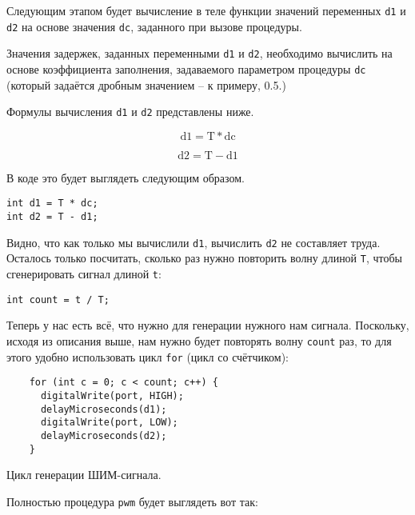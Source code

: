 \documentclass[../sparc.tex]{subfiles}
\begin{document}
Следующим этапом будет вычисление в теле функции значений переменных \texttt{d1}
и \texttt{d2} на основе значения \texttt{dc}, заданного при вызове процедуры.

Значения задержек, заданных переменными \texttt{d1} и \texttt{d2}, необходимо
вычислить на основе коэффициента заполнения, задаваемого параметром процедуры
\texttt{dc} (который задаётся дробным значением -- к примеру, 0.5.)

Формулы вычисления \texttt{d1} и \texttt{d2} представлены ниже.

\begin{equation}
  \mbox{d1} = \mbox{T} * \mbox{dc}
  \label{Формула вычисления времени подачи сигнала ``HIGH''}
\end{equation}

\begin{equation}
  \mbox{d2} = \mbox{T} - \mbox{d1}
  \label{Формула вычисления времени подачи сигнала ``LOW''}
\end{equation}

В коде это будет выглядеть следующим образом.

\begin{verbatim}
int d1 = T * dc;
int d2 = T - d1;
\end{verbatim}

Видно, что как только мы вычислили \texttt{d1}, вычислить \texttt{d2} не
составляет труда. Осталось только посчитать, сколько раз нужно повторить волну
длиной \texttt{T}, чтобы сгенерировать сигнал длиной \texttt{t}:

\begin{verbatim}
int count = t / T;
\end{verbatim}

Теперь у нас есть всё, что нужно для генерации нужного нам сигнала. Поскольку,
исходя из описания выше, нам нужно будет повторять волну \texttt{count} раз, то
для этого удобно использовать цикл \texttt{for} (цикл со счётчиком):

\begin{listing}[H]
  \begin{verbatim}
    for (int c = 0; c < count; c++) {
      digitalWrite(port, HIGH);
      delayMicroseconds(d1);
      digitalWrite(port, LOW);
      delayMicroseconds(d2);
    }
  \end{verbatim}
  \label{listing:pwm-cycle}
  \caption{Цикл генерации ШИМ-сигнала.}
\end{listing}

Полностью процедура \texttt{pwm} будет выглядеть вот так:
\end{document}
